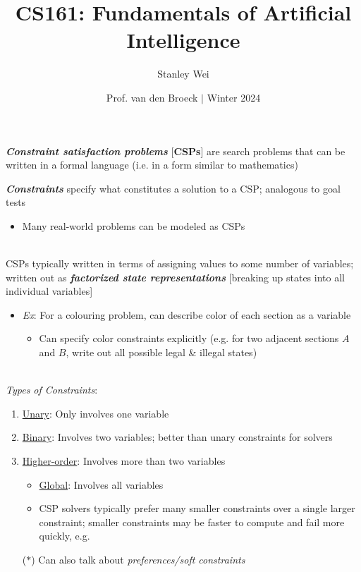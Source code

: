 \documentclass[12pt]{extarticle}
\title{CS161: Fundamentals of Artificial Intelligence}
\author{Stanley Wei}
\date{Prof. van den Broeck $\vert$ Winter 2024}
\theoremstyle{definition}
\theoremstyle{remark}
\newcommand{\pstart}[0]{\noindent}
\newcommand{\newp}[0]{~\\ \pstart}
\newcommand{\term}[1]{\noindent\textbf{\textit{#1}}}
\begin{document}
\pstart
\term{Constraint satisfaction problems} [\textbf{CSPs}] are search problems that can be written in a formal language (i.e. in a form similar to mathematics)

\vspace{7pt}\pstart
\term{Constraints} specify what constitutes a solution to a CSP; analogous to goal tests \begin{itemize}
    \item Many real-world problems can be modeled as CSPs
\end{itemize}

\newp
CSPs typically written in terms of assigning values to some number of variables; written out as \term{factorized state representations} [breaking up states into all individual variables] \begin{itemize}
    \item \textit{Ex}: For a colouring problem, can describe color of each section as a variable \begin{itemize}
        \item Can specify color constraints explicitly (e.g. for two adjacent sections $A$ and $B$, write out all possible legal \& illegal states)
    \end{itemize}
\end{itemize}

\newp
\textit{Types of Constraints}: \begin{enumerate}
    \item \ul{Unary}: Only involves one variable
    \item \ul{Binary}: Involves two variables; better than unary constraints for solvers
    \item \ul{Higher-order}: Involves more than two variables \begin{itemize}
        \item \ul{Global}: Involves all variables
        \item CSP solvers typically prefer many smaller constraints over a single larger constraint; smaller constraints may be faster to compute and fail more quickly, e.g.
    \end{itemize}
    \item[($\ast$)] Can also talk about \textit{preferences/soft constraints}
\end{enumerate}
\end{document}
